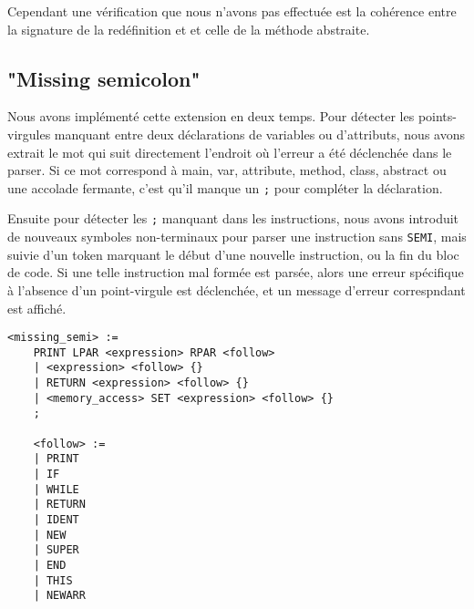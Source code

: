 \documentclass{article}
\begin{document}
Cependant une vérification que nous n'avons pas effectuée est la cohérence entre la signature de la redéfinition et 
et celle de la méthode abstraite.

\subsection{"Missing semicolon"}
Nous avons implémenté cette extension en deux temps. Pour détecter les points-virgules manquant entre deux déclarations de variables ou d'attributs, nous avons extrait le mot qui suit directement l'endroit où l'erreur a été déclenchée dans le parser. Si ce mot correspond à main, var, attribute, method, class, abstract ou une accolade fermante, c'est qu'il manque un \texttt{;} pour compléter la déclaration.

Ensuite pour détecter les \texttt{;} manquant dans les instructions, nous avons introduit de nouveaux symboles non-terminaux pour parser une instruction sans \texttt{SEMI}, mais suivie d'un token marquant le début d'une nouvelle instruction, ou la fin du bloc de code. Si une telle instruction mal formée est parsée, alors une erreur spécifique à l'absence d'un point-virgule est déclenchée, et un message d'erreur correspndant est affiché. 
\begin{lstlisting}[style=mystyle]
    <missing_semi> :=
    PRINT LPAR <expression> RPAR <follow>
    | <expression> <follow> {}
    | RETURN <expression> <follow> {}
    | <memory_access> SET <expression> <follow> {}
    ;
    
    <follow> :=
    | PRINT
    | IF
    | WHILE
    | RETURN
    | IDENT
    | NEW
    | SUPER
    | END
    | THIS
    | NEWARR
\end{lstlisting}
\end{document}
